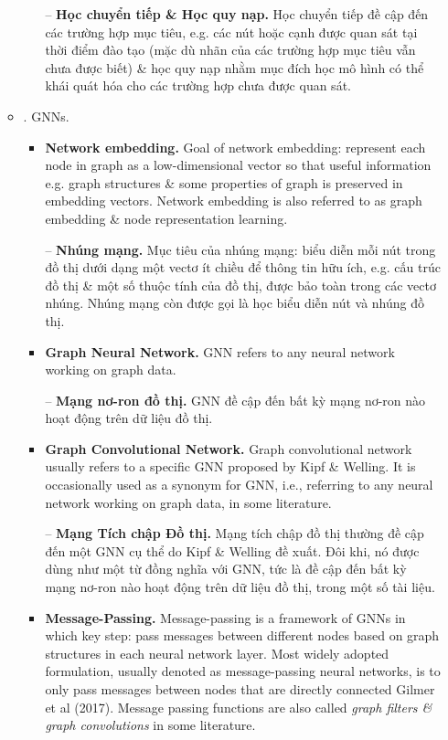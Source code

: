 \documentclass{article}
\begin{document}
\begin{itemize}
\begin{itemize}
\begin{enumerate}
            -- {\bf Học chuyển tiếp \& Học quy nạp.} Học chuyển tiếp đề cập đến các trường hợp mục tiêu, e.g. các nút hoặc cạnh được quan sát tại thời điểm đào tạo (mặc dù nhãn của các trường hợp mục tiêu vẫn chưa được biết) \& học quy nạp nhằm mục đích học mô hình có thể khái quát hóa cho các trường hợp chưa được quan sát.
        \end{enumerate}
        \item {. GNNs.}
        \begin{itemize}
            \item {\bf Network embedding.} Goal of network embedding: represent each node in graph as a low-dimensional vector so that useful information e.g. graph structures \& some properties of graph is preserved in embedding vectors. Network embedding is also referred to as graph embedding \& node representation learning.

            -- {\bf Nhúng mạng.} Mục tiêu của nhúng mạng: biểu diễn mỗi nút trong đồ thị dưới dạng một vectơ ít chiều để thông tin hữu ích, e.g. cấu trúc đồ thị \& một số thuộc tính của đồ thị, được bảo toàn trong các vectơ nhúng. Nhúng mạng còn được gọi là học biểu diễn nút và nhúng đồ thị.
            \item {\bf Graph Neural Network.} GNN refers to any neural network working on graph data.

            -- {\bf Mạng nơ-ron đồ thị.} GNN đề cập đến bất kỳ mạng nơ-ron nào hoạt động trên dữ liệu đồ thị.
            \item {\bf Graph Convolutional Network.} Graph convolutional network usually refers to a specific GNN proposed by {\sc Kipf \& Welling}. It is occasionally used as a synonym for GNN, i.e., referring to any neural network working on graph data, in some literature.

            -- {\bf Mạng Tích chập Đồ thị.} Mạng tích chập đồ thị thường đề cập đến một GNN cụ thể do {\sc Kipf \& Welling} đề xuất. Đôi khi, nó được dùng như một từ đồng nghĩa với GNN, tức là đề cập đến bất kỳ mạng nơ-ron nào hoạt động trên dữ liệu đồ thị, trong một số tài liệu.
            \item {\bf Message-Passing.} Message-passing is a framework of GNNs in which key step: pass messages between different nodes based on graph structures in each neural network layer. Most widely adopted formulation, usually denoted as message-passing neural networks, is to only pass messages between nodes that are directly connected Gilmer et al (2017). Message passing functions are also called {\it graph filters \& graph convolutions} in some literature.


\end{itemize}
\end{itemize}
\end{itemize}
\end{document}
